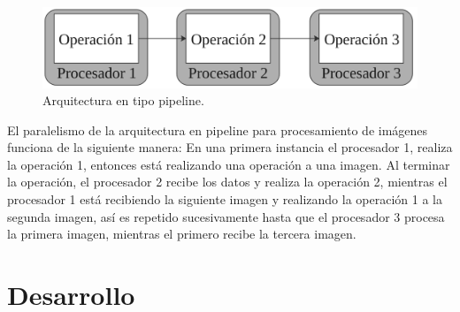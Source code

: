 \documentclass[twoside,spanish,ESP,MSc]{plantillaLabUPV}
\theoremstyle{definition}
\begin{document}
 
\begin{figure}[h]
	\centering
	\includegraphics[scale=0.4]{edrawimas/pipe}
	\caption{Arquitectura en tipo pipeline. 
		\label{pipe}}
\end{figure}

El paralelismo de la arquitectura en pipeline para procesamiento de imágenes funciona de la siguiente manera: En una primera instancia el procesador 1, realiza la operación 1, entonces está realizando una operación a una imagen. Al terminar la operación, el procesador 2 recibe los datos y realiza la operación 2, mientras el procesador 1 está recibiendo la siguiente imagen y realizando la operación 1 a la segunda imagen, así es repetido sucesivamente hasta que el procesador 3 procesa la primera imagen, mientras el primero recibe la tercera imagen. 


%
%
%
%
%
%



\chapter{Desarrollo}
\end{document}
